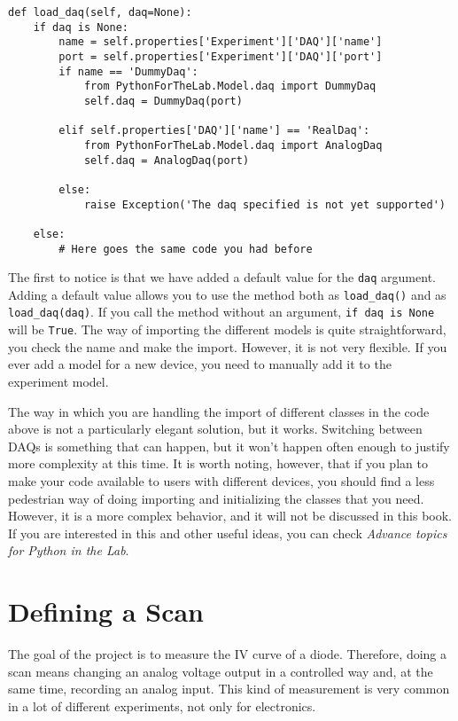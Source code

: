 {\begin{verbatim}
def load_daq(self, daq=None):
    if daq is None:
        name = self.properties['Experiment']['DAQ']['name']
        port = self.properties['Experiment']['DAQ']['port']
        if name == 'DummyDaq':
            from PythonForTheLab.Model.daq import DummyDaq
            self.daq = DummyDaq(port)
        
        elif self.properties['DAQ']['name'] == 'RealDaq':
            from PythonForTheLab.Model.daq import AnalogDaq
            self.daq = AnalogDaq(port)
        
        else:
            raise Exception('The daq specified is not yet supported')
    
    else:
        # Here goes the same code you had before
\end{verbatim}

The first to notice is that we have added a default value for the
\texttt{daq} argument. Adding a default value allows you to use the
method both as \texttt{load_daq()} and as \texttt{load_daq(daq)}. If
you call the method without an argument, \texttt{if daq is None} will
be \texttt{True}. The way of importing the different models is quite
straightforward, you check the name and make the import. However, it is
not very flexible. If you ever add a model for a new device, you need to
manually add it to the experiment model.


The way in which you are handling the import of different classes in the code above is not a particularly elegant solution, but it works.
Switching between DAQs is something that can happen, but it won't happen
often enough to justify more complexity at this time. It is worth
noting, however, that if you plan to make your code available to users
with different devices, you should find a less pedestrian way of doing
importing and initializing the classes that you need. However, it is a
more complex behavior, and it will not be discussed in this book. If you
are interested in this and other useful ideas, you can check
\emph{Advance topics for Python in the Lab}.

\section{Defining a Scan}\label{defining-ascan}
The goal of the project is to measure the {IV} curve of a diode.
Therefore, doing a scan means changing an analog voltage output in a
controlled way and, at the same time, recording an analog input. This
kind of measurement is very common in a lot of different experiments,
not only for electronics.

}

